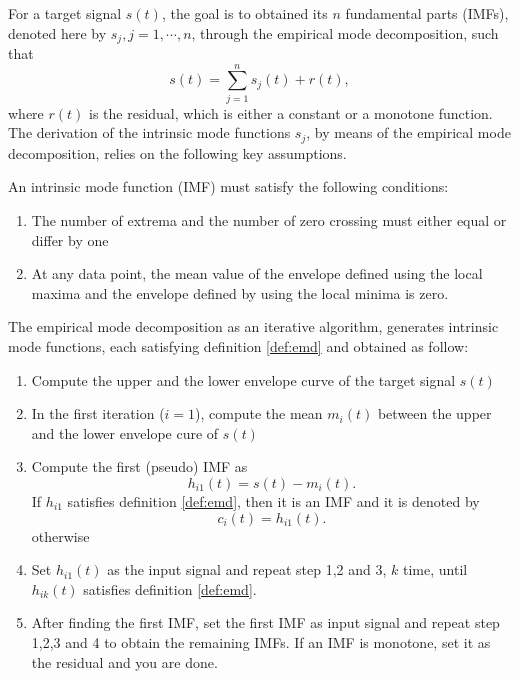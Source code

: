 \documentclass[../Main/thesis.tex]{subfiles}
\begin{document}
\justify
 For a target signal $s(t)$, the goal is to obtained its $n$ fundamental parts (IMFs), denoted here by $s_{j}, j =1,\cdots,n$, through the empirical mode decomposition, such that
\begin{equation}\label{eq:emd-decomposition}
s(t) = \sum_{j=1}^{n}s_{j}(t) + r(t),
\end{equation}
where $r(t)$ is the residual, which is either a constant or a monotone function. The derivation of the intrinsic mode functions $s_{j}$, by means of the empirical mode decomposition, relies on the following key assumptions.
\begin{definition}\label{def:emd}
An intrinsic mode function (IMF) must satisfy the following conditions:
\begin{enumerate}
\item The number of extrema and the number of zero crossing must either equal or differ by one 
\item At any data point, the mean value of the envelope defined using the local maxima and the envelope defined by using the local minima is zero.
\end{enumerate}
\end{definition}
The empirical mode decomposition as an iterative algorithm, generates intrinsic mode functions, each satisfying definition \ref{def:emd} and obtained as follow:
\begin{enumerate}
	\item Compute the upper and the lower envelope curve of the target signal $s(t)$
	\item In the first iteration ($i=1$), compute the mean $m_{i}(t)$ between the upper and the lower envelope cure of $s(t)$
	\item Compute the first (pseudo) IMF as 
	\begin{equation}\label{eq:proto}
		h_{i1}(t) = s(t)-m_{i}(t).
	\end{equation}
	If $h_{i1}$ satisfies definition \ref{def:emd}, then it is an IMF and it is denoted by 
	\begin{equation}\label{eq:imf}
		c_{i}(t) = h_{i1}(t).
	\end{equation}
	otherwise
	
	\item Set $h_{i1}(t)$ as the input signal and repeat step 1,2 and 3, $k$ time, until $h_{ik}(t)$ satisfies definition \ref{def:emd}.
	\item After finding the first IMF, set the first IMF as input signal and repeat step 1,2,3 and 4 to obtain the remaining IMFs. If an IMF is monotone, set it as the residual and you are done.
\end{enumerate}
\end{document}
